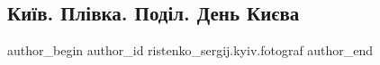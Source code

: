  
 
 
 
 

\subsection{Київ. Плівка. Поділ. День Києва}
\label{sec:28_05_2023.fb.ristenko_sergij.kyiv.fotograf.1.kyiv_plivka_podil_den_kyeva}

\ifcmt
 author_begin
   author_id ristenko_sergij.kyiv.fotograf
 author_end
\fi

